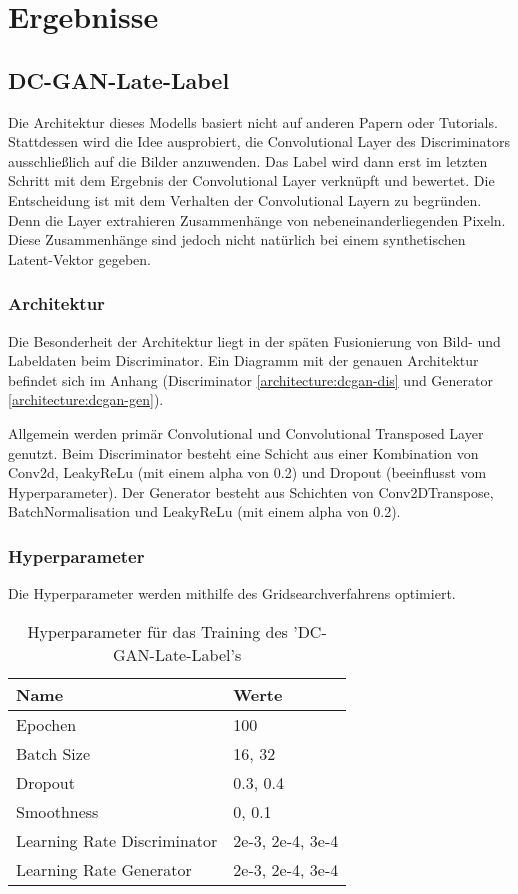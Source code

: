 
\chapter{Ergebnisse}

\section{DC-GAN-Late-Label}
Die Architektur dieses Modells basiert nicht auf anderen Papern oder Tutorials. 
Stattdessen wird die Idee ausprobiert, die Convolutional Layer des Discriminators ausschließlich auf die Bilder anzuwenden.
Das Label wird dann erst im letzten Schritt mit dem Ergebnis der Convolutional Layer verknüpft und bewertet.
Die Entscheidung ist mit dem Verhalten der Convolutional Layern zu begründen.
Denn die Layer extrahieren Zusammenhänge von nebeneinanderliegenden Pixeln.
Diese Zusammenhänge sind jedoch nicht natürlich bei einem synthetischen Latent-Vektor gegeben.

\subsection{Architektur}
Die Besonderheit der Architektur liegt in der späten Fusionierung von Bild- und Labeldaten beim Discriminator.
Ein Diagramm mit der genauen Architektur befindet sich im Anhang (Discriminator \cref{architecture:dcgan-dis} und Generator \cref{architecture:dcgan-gen}).


Allgemein werden primär Convolutional und Convolutional Transposed Layer genutzt.
Beim Discriminator besteht eine Schicht aus einer Kombination von Conv2d, LeakyReLu (mit einem alpha von 0.2) und Dropout (beeinflusst vom Hyperparameter).
Der Generator besteht aus Schichten von Conv2DTranspose, BatchNormalisation und LeakyReLu (mit einem alpha von 0.2).

\subsection{Hyperparameter}
Die Hyperparameter werden mithilfe des Gridsearchverfahrens optimiert.
\begin{table}[H]
	\centering
	\begin{tabular}{l l}
		Name                        & Werte            \\ \hline
		Epochen                     & 100              \\
		Batch Size                  & 16, 32           \\
		Dropout                     & 0.3, 0.4         \\
		Smoothness                  & 0, 0.1           \\
		Learning Rate Discriminator & 2e-3, 2e-4, 3e-4 \\
		Learning Rate Generator     & 2e-3, 2e-4, 3e-4
	\end{tabular}
	\caption{Hyperparameter für das Training des 'DC-GAN-Late-Label's}
\end{table}

